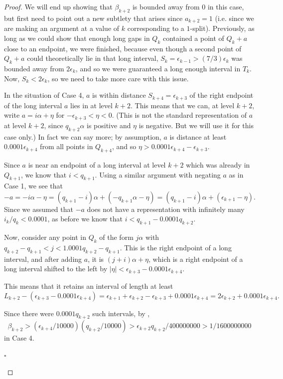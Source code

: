 \documentclass[11pt,reqno]{amsart}
\theoremstyle{definition}
\theoremstyle{plain}
\begin{document}
\begin{proof}
We will end up showing that $\beta_{k+2}$ is bounded away from $0$ in this case, but first need to point out a new subtlety that arises since $a_{k+2} = 1$ (i.e. since we are making an argument at a value of $k$ corresponding to a $1$-split). Previously, as long as we could show that enough long gaps in $Q_k$ contained a point of $Q_k + a$ close to an endpoint, we were finished, because even though a second point of $Q_k + a$ could theoretically lie in that long interval, $S_k = \epsilon_{k-1} > (7/3) \epsilon_k$ was bounded away from $2\epsilon_k$, and so we were guaranteed a long enough interval in $T_k$. Now, $S_k < 2\epsilon_k$, so we need to take more care with this issue. 

In the situation of Case 4, $a$ is within distance $S_{k+4} = \epsilon_{k+3}$ of the right endpoint of the long interval $a$ lies in at level $k+2$. This means that we can, at level $k+2$, write $a = i\alpha + \eta$ for $-\epsilon_{k+3} < \eta < 0$. (This is not the standard representation of $a$ at level $k+2$, since $q_{k+2} \alpha$ is positive and $\eta$ is negative. But we will use it for this case only.) In fact we can say more; by assumption, $a$ is distance at least $0.0001\epsilon_{k+4}$ from all points in 
$Q_{k+4}$, and so $\eta > 0.0001\epsilon_{k+4} - \epsilon_{k+3}$. 

Since $a$ is near an endpoint of a long interval at level $k+2$ which was already in $Q_{k+1}$, we know that $i < q_{k+1}$. Using a similar argument with negating $a$ as in Case 1, we see that
\[
-a = -i\alpha - \eta = (q_{k+1} - i)\alpha + (-q_{k+1}\alpha - \eta) = (q_{k+1} - i)\alpha + (\epsilon_{k+1} - \eta).
\]
Since we assumed that $-a$ does not have a representation with infinitely many $i_k/q_k < 0.0001$, as before we know 
that $i < q_{k+1} - 0.0001 q_{k+2}$. 

Now, consider any point in $Q_k$ of the form $j \alpha$ with $q_{k+2} - q_{k+1} < j < 1.0001q_{k+2} - q_{k+1}$. This is the right endpoint of a long interval, and after adding $a$, it is $(j + i)\alpha + \eta$, which is a right endpoint of a long interval shifted to the left by $|\eta| < \epsilon_{k+3} - 0.0001\epsilon_{k+4}$. 

This means that it retains an interval of length at least 
\[
L_{k+2} - (\epsilon_{k+3} - 0.0001\epsilon_{k+4}) = \epsilon_{k+1} + \epsilon_{k+2} - \epsilon_{k+3} + 0.0001\epsilon_{k+4}
= 2\epsilon_{k+2} + 0.0001\epsilon_{k+4}.
\]

Since there were $0.0001q_{k+2}$ such intervals, by ,
\[
\beta_{k+2} > (\epsilon_{k+4}/10000)(q_{k+2}/10000) > \epsilon_{k+2}q_{k+2}/400000000 > 1/1600000000
\]
in Case 4.
\begin{flushright}
    $\square$\\
\end{flushright}


\end{proof}
\end{document}

